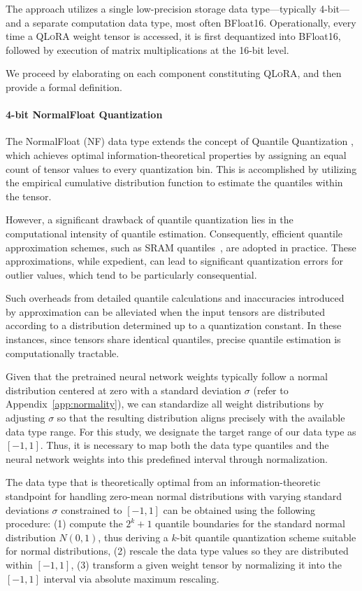 The approach utilizes a single low-precision storage data type—typically 4-bit—and a separate computation data type, most often BFloat16. Operationally, every time a \textsc{QLoRA} weight tensor is accessed, it is first dequantized into BFloat16, followed by execution of matrix multiplications at the 16-bit level.

We proceed by elaborating on each component constituting \textsc{QLoRA}, and then provide a formal definition.

\paragraph{4-bit NormalFloat Quantization} The NormalFloat (NF) data type extends the concept of Quantile Quantization \citep{dettmers2022optimizers}, which achieves optimal information-theoretical properties by assigning an equal count of tensor values to every quantization bin. This is accomplished by utilizing the empirical cumulative distribution function to estimate the quantiles within the tensor.

However, a significant drawback of quantile quantization lies in the computational intensity of quantile estimation. Consequently, efficient quantile approximation schemes, such as SRAM quantiles~\citep{dettmers2022optimizers}, are adopted in practice. These approximations, while expedient, can lead to significant quantization errors for outlier values, which tend to be particularly consequential.

Such overheads from detailed quantile calculations and inaccuracies introduced by approximation can be alleviated when the input tensors are distributed according to a distribution determined up to a quantization constant. In these instances, since tensors share identical quantiles, precise quantile estimation is computationally tractable.

Given that the pretrained neural network weights typically follow a normal distribution centered at zero with a standard deviation $\sigma$ (refer to Appendix~\ref{app:normality}), we can standardize all weight distributions by adjusting $\sigma$ so that the resulting distribution aligns precisely with the available data type range. For this study, we designate the target range of our data type as $[-1, 1]$. Thus, it is necessary to map both the data type quantiles and the neural network weights into this predefined interval through normalization.

The data type that is theoretically optimal from an information-theoretic standpoint for handling zero-mean normal distributions with varying standard deviations $\sigma$ constrained to $[-1, 1]$ can be obtained using the following procedure: (1) compute the $2^k+1$ quantile boundaries for the standard normal distribution $N(0, 1)$, thus deriving a $k$-bit quantile quantization scheme suitable for normal distributions, (2) rescale the data type values so they are distributed within $[-1, 1]$, (3) transform a given weight tensor by normalizing it into the $[-1, 1]$ interval via absolute maximum rescaling.

